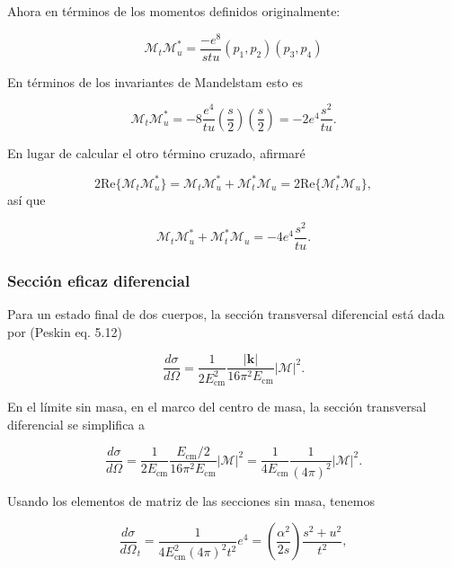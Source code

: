 Ahora en términos de los momentos definidos originalmente:

\begin{equation}
\mathcal{M}_t \mathcal{M}_u^* = \frac{-e^8}{stu} (p_1, p_2) (p_3, p_4)
\end{equation}

En términos de los invariantes de Mandelstam esto es

\begin{equation}
\mathcal{M}_t \mathcal{M}_u^* = -8 \frac{e^4}{tu} \left( \frac{s}{2} \right) \left( \frac{s}{2} \right) = -2e^4 \frac{s^2}{tu}.
\end{equation}

En lugar de calcular el otro término cruzado, afirmaré

\begin{equation}
2\text{Re}\{\mathcal{M}_t \mathcal{M}_u^*\} = \mathcal{M}_t \mathcal{M}_u^* + \mathcal{M}_t^* \mathcal{M}_u = 2\text{Re}\{\mathcal{M}_t^* \mathcal{M}_u\},
\end{equation}
así que

\begin{equation}
\mathcal{M}_t \mathcal{M}_u^* + \mathcal{M}_t^* \mathcal{M}_u = -4e^4 \frac{s^2}{tu}.
\end{equation}

\subsubsection{Sección eficaz diferencial}
Para un estado final de dos cuerpos, la sección transversal diferencial está dada por (Peskin eq. 5.12)

\begin{equation}
\frac{d\sigma}{d\Omega} = \frac{1}{2E_{\text{cm}}^2} \frac{|\mathbf{k}|}{16\pi^2 E_{\text{cm}}} |\mathcal{M}|^2.
\end{equation}

En el límite sin masa, en el marco del centro de masa, la sección transversal diferencial se simplifica a

\begin{equation}
\frac{d\sigma}{d\Omega} = \frac{1}{2E_{\text{cm}}} \frac{E_{\text{cm}}/2}{16\pi^2 E_{\text{cm}}} |\mathcal{M}|^2 = \frac{1}{4E_{\text{cm}}} \frac{1}{(4\pi)^2} |\mathcal{M}|^2.
\end{equation}

Usando los elementos de matriz de las secciones sin masa, tenemos

\begin{equation}
\frac{d\sigma}{d\Omega}_t = \frac{1}{4E_{\text{cm}}^2 (4\pi)^2 t^2} e^4 = \left( \frac{\alpha^2}{2s} \right) \frac{s^2 + u^2}{t^2},
\end{equation}

